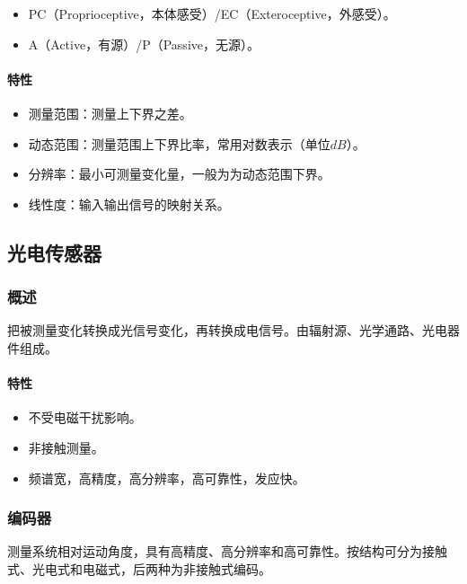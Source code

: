 \documentclass[
12pt, %
a4paper, 
oneside, %
headinclude,footinclude, %
]{scrartcl}
\begin{document}
\begin{itemize}
\item PC（Proprioceptive，本体感受）/EC（Exteroceptive，外感受）。
\item A（Active，有源）/P（Passive，无源）。
\end{itemize}
\paragraph{特性}
\begin{itemize}
\item 测量范围：测量上下界之差。    
\item 动态范围：测量范围上下界比率，常用对数表示（单位$ dB $）。
\item 分辨率：最小可测量变化量，一般为为动态范围下界。
\item 线性度：输入输出信号的映射关系。
\end{itemize}
\subsection[光电传感器]{光电传感器}
\subsubsection[概述]{概述}
把被测量变化转换成光信号变化，再转换成电信号。由辐射源、光学通路、光电器件组成。
\paragraph{特性}
\begin{itemize}
\item 不受电磁干扰影响。
\item 非接触测量。
\item 频谱宽，高精度，高分辨率，高可靠性，发应快。
\end{itemize}
\subsubsection[编码器]{编码器}
测量系统相对运动角度，具有高精度、高分辨率和高可靠性。按结构可分为接触式、光电式和电磁式，后两种为非接触式编码。
\end{document}
